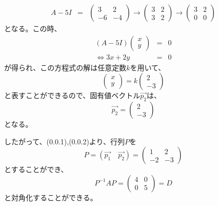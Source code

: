 \documentclass[a4j]{jsarticle}
\begin{document}
\begin{spacing}{1.6}
\begin{qparts}
  \begin{eqnarray*}
    A - 5I & = &
    \left(
    \begin{array}{ccc}
      3 & 2 \\
      -6 & -4
    \end{array}
    \right)
    \rightarrow
    \left(
    \begin{array}{ccc}
      3 & 2 \\
      3 & 2
    \end{array}
    \right)
    \rightarrow
    \left(
    \begin{array}{ccc}
      3 & 2 \\
      0 & 0
    \end{array}
    \right)
  \end{eqnarray*}
  となる。この時、
  \begin{eqnarray*}
    (A - 5I) \left(
    \begin{array}{ccc}
      x \\
      y
    \end{array}
    \right)
    & = & 0 \\
    \Leftrightarrow
    3x + 2y & = & 0
  \end{eqnarray*}
  が得られ、この方程式の解は任意定数$k$を用いて、
  \begin{equation*}
    \left(
    \begin{array}{ccc}
      x \\
      y
    \end{array}
    \right)
    = k
    \left(
    \begin{array}{ccc}
      2 \\
      -3
    \end{array}
    \right)
  \end{equation*}
  と表すことができるので、固有値ベクトル$\overrightarrow{p_2}$は、
  \begin{equation}
    \overrightarrow{p_2} =
    \left(
    \begin{array}{ccc}
      2 \\
      -3
    \end{array}
    \right)
  \end{equation}
  となる。

  \newpage

  したがって、(0.0.1),(0.0.2)より、行列$P$を
  \begin{equation*}
    P = (\overrightarrow{p_1} \quad \overrightarrow{p_2}) =
    \left(
    \begin{array}{ccc}
      1 & 2 \\
      -2 & -3
    \end{array}
    \right)
  \end{equation*}
  とすることができ、
  \begin{equation}
    P^{-1}AP =
    \left(
    \begin{array}{ccc}
      4 & 0 \\
      0 & 5
    \end{array}
    \right)
    = D
  \end{equation}
  と対角化することができる。\\\\


\end{qparts}
\end{spacing}
\end{document}
